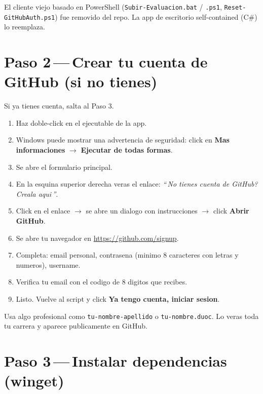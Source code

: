 \documentclass[11pt,a4paper,oneside]{report}
\begin{document}
\begin{notebox}
El cliente viejo basado en PowerShell (\texttt{Subir-Evaluacion.bat} / \texttt{.ps1}, \texttt{Reset-GitHubAuth.ps1}) fue removido del repo. La app de escritorio self-contained (C\#) lo reemplaza.
\end{notebox}

\section{Paso 2\,---\,Crear tu cuenta de GitHub (si no tienes)}

Si ya tienes cuenta, salta al Paso 3.

\begin{enumerate}
  \item Haz doble-click en el ejecutable de la app.
  \item Windows puede mostrar una advertencia de seguridad: click en \textbf{Mas informaciones} $\rightarrow$ \textbf{Ejecutar de todas formas}.
  \item Se abre el formulario principal.
  \item En la esquina superior derecha veras el enlace: \emph{\textquotedblleft\,No tienes cuenta de GitHub? Creala aqui\,\textquotedblright}.
  \item Click en el enlace $\rightarrow$ se abre un dialogo con instrucciones $\rightarrow$ click \textbf{Abrir GitHub}.
  \item Se abre tu navegador en \url{https://github.com/signup}.
  \item Completa: email personal, contrasena (minimo 8 caracteres con letras y numeros), username.
  \item Verifica tu email con el codigo de 8 digitos que recibes.
  \item Listo. Vuelve al script y click \textbf{Ya tengo cuenta, iniciar sesion}.
\end{enumerate}

\begin{notebox}
Usa algo profesional como \texttt{tu-nombre-apellido} o \texttt{tu-nombre.duoc}. Lo veras toda tu carrera y aparece publicamente en GitHub.
\end{notebox}

\section{Paso 3\,---\,Instalar dependencias (winget)}
\end{document}
